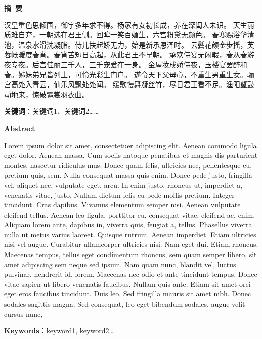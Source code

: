 \cleardoublepage{}
\begin{center}
    \bfseries {} 摘~要
\end{center}

汉皇重色思倾国，御宇多年求不得。杨家有女初长成，养在深闺人未识。
天生丽质难自弃，一朝选在君王侧。回眸一笑百媚生，六宫粉黛无颜色。
春寒赐浴华清池，温泉水滑洗凝脂。侍儿扶起娇无力，始是新承恩泽时。
云鬓花颜金步摇，芙蓉帐暖度春宵。春宵苦短日高起，从此君王不早朝。
承欢侍宴无闲暇，春从春游夜专夜。后宫佳丽三千人，三千宠爱在一身。
金屋妆成娇侍夜，玉楼宴罢醉和春。姊妹弟兄皆列土，可怜光彩生门户。
遂令天下父母心，不重生男重生女。骊宫高处入青云，仙乐风飘处处闻。
缓歌慢舞凝丝竹，尽日君王看不足。渔阳鼙鼓动地来，惊破霓裳羽衣曲。 

\noindent \textbf{关键词}：关键词1、关键词2……

\cleardoublepage{}
\begin{center}
    \bfseries {} Abstract
\end{center}

    Lorem ipsum dolor sit amet, consectetuer adipiscing elit. Aenean commodo ligula eget dolor. Aenean massa. Cum sociis natoque penatibus et magnis dis parturient montes, nascetur ridiculus mus. Donec quam felis, ultricies nec, pellentesque eu, pretium quis, sem. Nulla consequat massa quis enim. Donec pede justo, fringilla vel, aliquet nec, vulputate eget, arcu. In enim justo, rhoncus ut, imperdiet a, venenatis vitae, justo. Nullam dictum felis eu pede mollis pretium. Integer tincidunt. Cras dapibus. Vivamus elementum semper nisi. Aenean vulputate eleifend tellus. Aenean leo ligula, porttitor eu, consequat vitae, eleifend ac, enim. Aliquam lorem ante, dapibus in, viverra quis, feugiat a, tellus. Phasellus viverra nulla ut metus varius laoreet. Quisque rutrum. Aenean imperdiet. Etiam ultricies nisi vel augue. Curabitur ullamcorper ultricies nisi. Nam eget dui. Etiam rhoncus. Maecenas tempus, tellus eget condimentum rhoncus, sem quam semper libero, sit amet adipiscing sem neque sed ipsum. Nam quam nunc, blandit vel, luctus pulvinar, hendrerit id, lorem. Maecenas nec odio et ante tincidunt tempus. Donec vitae sapien ut libero venenatis faucibus. Nullam quis ante. Etiam sit amet orci eget eros faucibus tincidunt. Duis leo. Sed fringilla mauris sit amet nibh. Donec sodales sagittis magna. Sed consequat, leo eget bibendum sodales, augue velit cursus nunc, 

\noindent \textbf{Keywords}：keyword1, keyword2…
